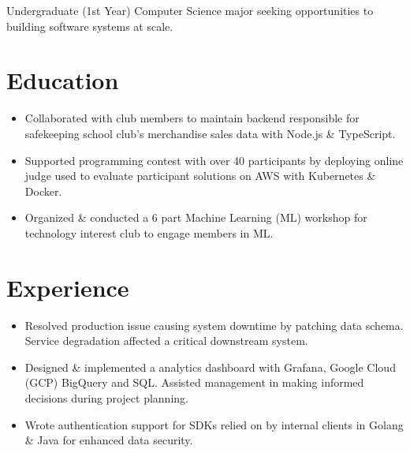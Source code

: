 %
%


\fancyhead{} %


Undergraduate (1st Year) Computer Science major seeking opportunities to building software systems at scale.

\section{Education}
\begin{itemize}
  \item Collaborated with club members to maintain backend responsible for safekeeping school club's merchandise sales data with Node.js \& TypeScript.
\end{itemize}
\begin{itemize}
  \item Supported programming contest with over 40 participants by deploying online judge used to evaluate participant solutions on AWS with Kubernetes \& Docker.
  \item Organized \& conducted a 6 part Machine Learning  (ML) workshop for technology interest club to engage members in ML.
\end{itemize}


\section{Experience}
\begin{itemize}
    \item Resolved production issue causing system downtime by patching data schema. Service degradation affected a critical downstream system.
    \item 
        Designed \& implemented a analytics dashboard with Grafana, Google Cloud (GCP) BigQuery and SQL. Assisted management in making informed decisions during project planning.
    \item Wrote authentication support for SDKs relied on by internal clients in Golang \& Java for enhanced data security.
\end{itemize}

